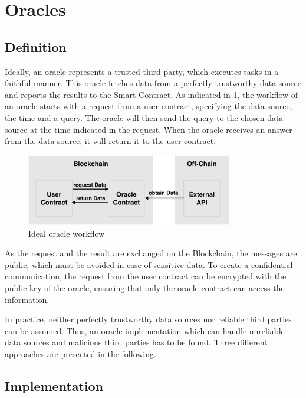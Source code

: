 \documentclass[conference]{IEEEtran}
\begin{document}
\section{Oracles}
\subsection{Definition}
Ideally, an oracle represents a trusted third party, which executes tasks in a faithful manner. This oracle fetches data from a perfectly trustworthy data source and reports the results to the Smart Contract. As indicated in \ref{idealOracle}, the workflow of an oracle starts with a request from a user contract, specifying the data source, the time and a query. The oracle will then send the query to the chosen data source at the time indicated in the request. When the oracle receives an answer from the data source, it will return it to the user contract. \cite{Ellis2017} \par 
\begin{figure}[h]
	\begin{center}
		\includegraphics[width=9cm]{idealOracle.png}
		\caption{Ideal oracle workflow}
		\label{idealOracle}
	\end{center}
\end{figure} 
As the request and the result are exchanged on the Blockchain, the messages are public, which must be avoided in case of sensitive data. To create a confidential communication, the request from the user contract can be encrypted with the public key of the oracle, ensuring that only the oracle contract can access the information. \cite{Ellis2017} \par
In practice, neither perfectly trustworthy data sources nor reliable third parties can be assumed. Thus, an oracle implementation which can handle unreliable data sources and malicious third parties has to be found. Three different approaches are presented in the following. \cite{Mik2017} 
\subsection{Implementation}
\end{document}
